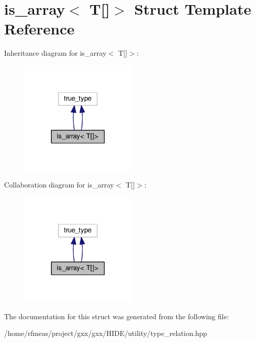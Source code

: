 \hypertarget{structis__array_3_01T[]_4}{}\section{is\+\_\+array$<$ T\mbox{[}\mbox{]}$>$ Struct Template Reference}
\label{structis__array_3_01T[]_4}


Inheritance diagram for is\+\_\+array$<$ T\mbox{[}\mbox{]}$>$\+:
\nopagebreak
\begin{figure}[H]
\begin{center}
\leavevmode
\includegraphics[width=158pt]{structis__array_3_01T[]_4__inherit__graph}
\end{center}
\end{figure}


Collaboration diagram for is\+\_\+array$<$ T\mbox{[}\mbox{]}$>$\+:
\nopagebreak
\begin{figure}[H]
\begin{center}
\leavevmode
\includegraphics[width=158pt]{structis__array_3_01T[]_4__coll__graph}
\end{center}
\end{figure}


The documentation for this struct was generated from the following file\+:\begin{DoxyCompactItemize}
\item 
/home/rfmeas/project/gxx/gxx/\+H\+I\+D\+E/utility/type\+\_\+relation.\+hpp\end{DoxyCompactItemize}

